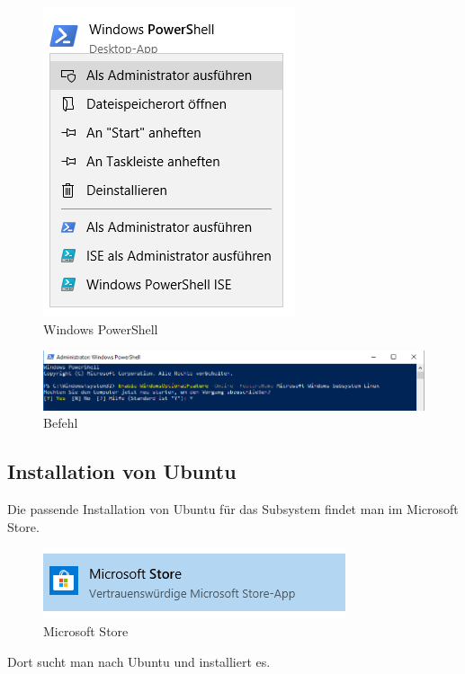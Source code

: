 \begin{figure}[H]
\centering
\includegraphics[scale=0.8]{Bilder/PowerShell.PNG}
\caption{Windows PowerShell}
\label{fig:PowerShell}
\end{figure}

\begin{figure}[H]
\centering
\includegraphics[scale=0.5]{Bilder/Befehl.PNG}
\caption{Befehl}
\label{fig:Befehl}
\end{figure}



\subsection{Installation von Ubuntu}
Die passende Installation von Ubuntu für das Subsystem findet man im Microsoft Store.

\begin{figure}[H]
\centering
\includegraphics[scale=1]{Bilder/Store.PNG}
\caption{Microsoft Store}
\label{fig:Store}
\end{figure}

Dort sucht man nach Ubuntu und installiert es.

